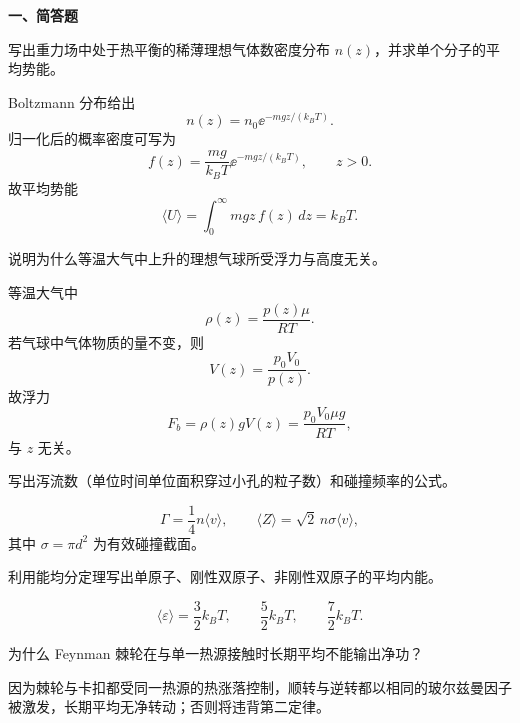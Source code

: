 ﻿


\textbf{一、简答题}
\begin{question}
写出重力场中处于热平衡的稀薄理想气体数密度分布 $n(z)$，并求单个分子的平均势能。
\begin{solution}

Boltzmann 分布给出
\[
 n(z)=n_0 \ee^{-mgz/(k_BT)}.
\]
归一化后的概率密度可写为
\[
 f(z)=\frac{mg}{k_BT}\ee^{-mgz/(k_BT)},\qquad z>0.
\]
故平均势能
\[
\langle U\rangle=\int_0^{\infty}mgz\,f(z)\,dz=k_BT.
\]
\end{solution}
\end{question}

\begin{question}
说明为什么等温大气中上升的理想气球所受浮力与高度无关。
\begin{solution}

等温大气中
\[
\rho(z)=\frac{p(z)\mu}{RT}.
\]
若气球中气体物质的量不变，则
\[
V(z)=\frac{p_0V_0}{p(z)}.
\]
故浮力
\[
F_b=\rho(z)gV(z)=\frac{p_0V_0\mu g}{RT},
\]
与 $z$ 无关。
\end{solution}
\end{question}

\begin{question}
写出泻流数（单位时间单位面积穿过小孔的粒子数）和碰撞频率的公式。
\begin{solution}

\[
\Gamma=\frac14 n\langle v\rangle,
\qquad
\langle Z\rangle=\sqrt2\,n\sigma\langle v\rangle,
\]
其中 $\sigma=\pi d^2$ 为有效碰撞截面。
\end{solution}
\end{question}

\begin{question}
利用能均分定理写出单原子、刚性双原子、非刚性双原子的平均内能。
\begin{solution}

\[
\langle\varepsilon\rangle=\frac32k_BT,\qquad \frac52k_BT,\qquad \frac72k_BT.
\]
\end{solution}
\end{question}

\begin{question}
为什么 Feynman 棘轮在与单一热源接触时长期平均不能输出净功？
\begin{solution}

因为棘轮与卡扣都受同一热源的热涨落控制，顺转与逆转都以相同的玻尔兹曼因子被激发，长期平均无净转动；否则将违背第二定律。


\end{solution}
\end{question}

